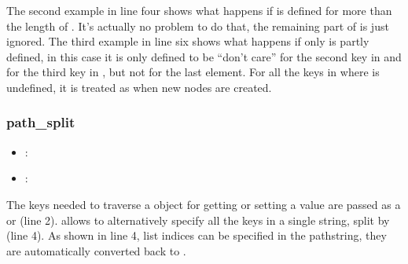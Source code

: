 \documentclass[a4paper,10pt,english]{sphinxmanual}
\begin{document}
\sphinxAtStartPar
The second example in line four shows what happens if  is defined for more than the length of . It’s actually no problem to do that, the remaining part of  is just ignored. The third example in line six shows what happens if  only is partly defined, in this case it is only defined to be “don’t care” for the second key in  and  for the third key in , but not for the last element. For all the keys in  where  is undefined, it is treated as  when new nodes are created.


\subsubsection{path\_split}
\label{\detokenize{README:path-split}}\begin{itemize}
\item {}
\sphinxAtStartPar
{}: 

\item {}
\sphinxAtStartPar
{}: 

\end{itemize}

\sphinxAtStartPar
The keys needed to traverse a \sphinxhyphen{}object for getting or setting a value are passed as a  or  (line 2).  allows to alternatively specify all the keys in a single string, split by  (line 4). As shown in line 4, list indices can be specified in the path\sphinxhyphen{}string, they are automatically converted back to .

\begin{sphinxVerbatim}[commandchars=\\\{\},numbers=left,firstnumber=1,stepnumber=1]
    \PYG{p}{[} \PYG{p}{]}
\PYG{p}{[}  \PYG{p}{]}
\PYG{p}{[}\PYG{p}{]}
\end{sphinxVerbatim}
\end{document}
